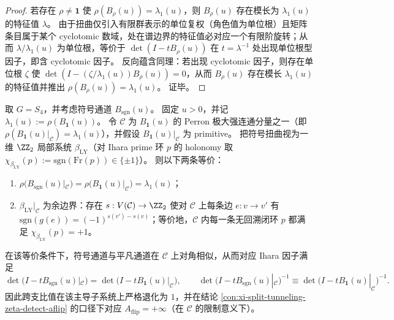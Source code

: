 \begin{proof}
若存在 \(\rho\neq\mathbf 1\) 使 \(\rho(B_\rho(u))=\lambda_1(u)\)，则 \(B_\rho(u)\) 存在模长为 \(\lambda_1(u)\) 的特征值 \(\lambda\)。
由于扭曲仅引入有限群表示的单位复权（角色值为单位根）且矩阵条目属于某个 cyclotomic 数域，处在谱边界的特征值必对应一个有限阶旋转；从而 \(\lambda/\lambda_1(u)\) 为单位根，等价于 \(\det(I-tB_\rho(u))\) 在 \(t=\lambda^{-1}\) 处出现单位根型因子，即含 cyclotomic 因子。
反向蕴含同理：若出现 cyclotomic 因子，则存在单位根 \(\zeta\) 使 \(\det(I-(\zeta/\lambda_1(u))B_\rho(u))=0\)，从而 \(B_\rho(u)\) 存在模长 \(\lambda_1(u)\) 的特征值并推出 \(\rho(B_\rho(u))=\lambda_1(u)\)。
证毕。
\end{proof}

\begin{corollary}\label{cor:ihara-sgn-perron-coboundary-equivalence}
取 \(G=S_4\)，并考虑符号通道 \(B_{\mathrm{sgn}}(u)\)。
固定 \(u>0\)，并记 \(\lambda_1(u):=\rho(B_{\mathbf 1}(u))\)。
令 \(\mathcal C\) 为 \(B_{\mathbf 1}(u)\) 的 Perron 极大强连通分量之一（即 \(\rho(B_{\mathbf 1}(u)|_{\mathcal C})=\lambda_1(u)\)），并假设 \(B_{\mathbf 1}(u)|_{\mathcal C}\) 为 primitive。
把符号扭曲视为一维 \(\ZZ_2\) 局部系统 \(\beta_{\mathrm{LY}}\)（对 Ihara prime 环 \(p\) 的 holonomy 取 \(\chi_{\beta_{\mathrm{LY}}}(p):=\mathrm{sgn}(\mathrm{Fr}(p))\in\{\pm1\}\)）。
则以下两条等价：
\begin{enumerate}
  \item \(\rho\!\bigl(B_{\mathrm{sgn}}(u)|_{\mathcal C}\bigr)=\rho\!\bigl(B_{\mathbf 1}(u)|_{\mathcal C}\bigr)=\lambda_1(u)\)；
  \item \(\beta_{\mathrm{LY}}|_{\mathcal C}\) 为余边界：存在 \(s:V(\mathcal C)\to\ZZ_2\) 使对 \(\mathcal C\) 上每条边 \(e:v\to v'\) 有 \(\mathrm{sgn}(g(e))=(-1)^{s(v')-s(v)}\)；等价地，\(\mathcal C\) 内每一条无回溯闭环 \(p\) 都满足 \(\chi_{\beta_{\mathrm{LY}}}(p)=+1\)。
\end{enumerate}
在该等价条件下，符号通道与平凡通道在 \(\mathcal C\) 上对角相似，从而对应 Ihara 因子满足
\[
\det\bigl(I-tB_{\mathrm{sgn}}(u)|_{\mathcal C}\bigr)=\det\bigl(I-tB_{\mathbf 1}(u)|_{\mathcal C}\bigr),
\qquad
\det\bigl(I-tB_{\mathrm{sgn}}(u)|_{\mathcal C}\bigr)^{-1}\equiv \det\bigl(I-tB_{\mathbf 1}(u)|_{\mathcal C}\bigr)^{-1}.
\]
因此跨支比值在该主导子系统上严格退化为 \(1\)，并在结论 \ref{con:xi-split-tunneling-zeta-detect-aflip} 的口径下对应 \(A_{\mathrm{flip}}=+\infty\)（在 \(\mathcal C\) 的限制意义下）。
\end{corollary}
